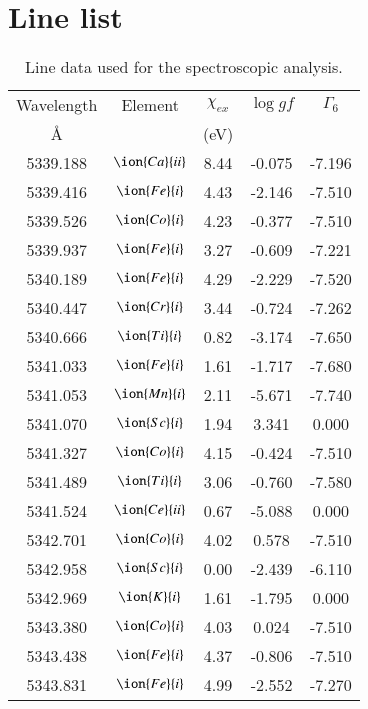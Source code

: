 \documentclass[fleqn,usenatbib]{mnras}
\begin{document}
\section{Line list}
 \begin{center}
 \begin{table}
 \caption{Line data used for the spectroscopic analysis.}\label{line_data}
 \begin{tabular}{ccccc}
 \hline
 Wavelength & Element & $\chi_{ex}$ &  $\log gf$ & $\varGamma_{6}$ \\
   \AA{}    &         &  (eV)       &            &                 \\
 \hline
5339.188 &  $\ion{Ca}{ii}$  & 8.44 & -0.075 & -7.196 \\ 
5339.416 &  $\ion{Fe}{i}$  & 4.43 & -2.146 & -7.510 \\ 
5339.526 &  $\ion{Co}{i}$  & 4.23 & -0.377 & -7.510 \\ 
5339.937 &  $\ion{Fe}{i}$  & 3.27 & -0.609 & -7.221 \\ 
5340.189 &  $\ion{Fe}{i}$  & 4.29 & -2.229 & -7.520 \\ 
5340.447 &  $\ion{Cr}{i}$  & 3.44 & -0.724 & -7.262 \\ 
5340.666 &  $\ion{Ti}{i}$  & 0.82 & -3.174 & -7.650 \\ 
5341.033 &  $\ion{Fe}{i}$  & 1.61 & -1.717 & -7.680 \\ 
5341.053 &  $\ion{Mn}{i}$  & 2.11 & -5.671 & -7.740 \\ 
5341.070 &  $\ion{Sc}{i}$  & 1.94 & 3.341 & 0.000 \\ 
5341.327 &  $\ion{Co}{i}$  & 4.15 & -0.424 & -7.510 \\ 
5341.489 &  $\ion{Ti}{i}$  & 3.06 & -0.760 & -7.580 \\ 
5341.524 &  $\ion{Ce}{ii}$  & 0.67 & -5.088 & 0.000 \\ 
5342.701 &  $\ion{Co}{i}$  & 4.02 & 0.578 & -7.510 \\ 
5342.958 &  $\ion{Sc}{i}$  & 0.00 & -2.439 & -6.110 \\ 
5342.969 &  $\ion{K}{i}$  & 1.61 & -1.795 & 0.000 \\ 
5343.380 &  $\ion{Co}{i}$  & 4.03 & 0.024 & -7.510 \\ 
5343.438 &  $\ion{Fe}{i}$  & 4.37 & -0.806 & -7.510 \\ 
5343.831 &  $\ion{Fe}{i}$  & 4.99 & -2.552 & -7.270 \\ 

\end{tabular}
\end{table}
\end{center}
\end{document}
